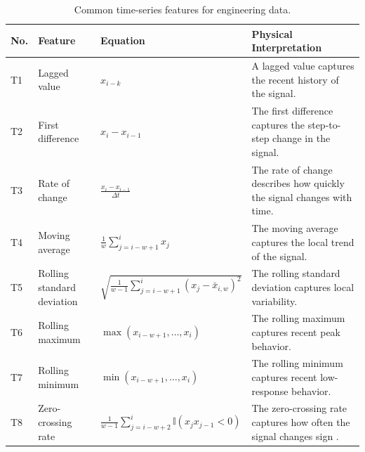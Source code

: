 \documentclass[12pt,letter]{article}
\begin{document}
\begin{table}[H]
	\centering
	\caption{Common time-series features for engineering data.}
	\label{tab:time_series_features}
	\begin{tabular}{p{} p{} p{} p{}}
		\hline
		\textbf{No.} & \textbf{Feature} & \textbf{Equation} & \textbf{Physical Interpretation} \\
		\hline
		T1 & Lagged value 
		& \(\displaystyle x_{i-k}\) 
		& A lagged value captures the recent history of the signal. \\
		
		T2 & First difference 
		& \(\displaystyle x_i-x_{i-1}\) 
		& The first difference captures the step-to-step change in the signal. \\
		
		T3 & Rate of change 
		& \(\displaystyle \frac{x_i-x_{i-1}}{\Delta t}\) 
		& The rate of change describes how quickly the signal changes with time. \\
		
		T4 & Moving average 
		& \(\displaystyle \frac{1}{w}\sum_{j=i-w+1}^{i}x_j\) 
		& The moving average captures the local trend of the signal. \\
		
		T5 & Rolling standard deviation 
		& \(\displaystyle \sqrt{\frac{1}{w-1}\sum_{j=i-w+1}^{i}(x_j-\bar{x}_{i,w})^2}\) 
		& The rolling standard deviation captures local variability. \\
		
		T6 & Rolling maximum 
		& \(\displaystyle \max(x_{i-w+1},\ldots,x_i)\) 
		& The rolling maximum captures recent peak behavior. \\
		
		T7 & Rolling minimum 
		& \(\displaystyle \min(x_{i-w+1},\ldots,x_i)\) 
		& The rolling minimum captures recent low-response behavior. \\
		
		T8 & Zero-crossing rate 
		& \(\displaystyle \frac{1}{w-1}\sum_{j=i-w+2}^{i}\mathbb{I}(x_jx_{j-1}<0)\) 
		& The zero-crossing rate captures how often the signal changes sign \protect\footnotemark[1]. \\
		\hline
	\end{tabular}
\end{table}




\end{document}
